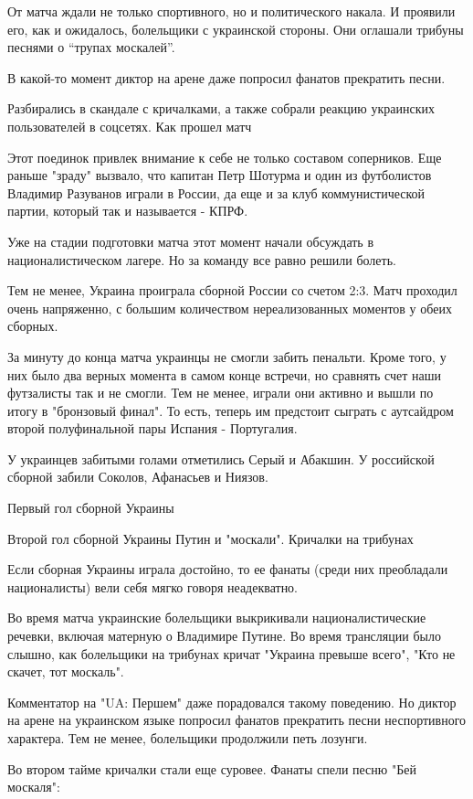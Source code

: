 От матча ждали не только спортивного, но и политического накала. И проявили
его, как и ожидалось, болельщики с украинской стороны. Они оглашали трибуны
песнями о \enquote{трупах москалей}. 

В какой-то момент диктор на арене даже попросил фанатов прекратить песни.

Разбирались в скандале с кричалками, а также собрали реакцию украинских пользователей в соцсетях.
Как прошел матч

Этот поединок привлек внимание к себе не только составом соперников. Еще раньше "зраду" вызвало, что капитан Петр Шотурма и один из футболистов Владимир Разуванов играли в России, да еще и за клуб коммунистической партии, который так и называется - КПРФ.

Уже на стадии подготовки матча этот момент начали обсуждать в националистическом лагере. Но за команду все равно решили болеть. 

Тем не менее, Украина проиграла сборной России со счетом 2:3. Матч проходил очень напряженно, с большим количеством нереализованных моментов у обеих сборных.

За минуту до конца матча украинцы не смогли забить пенальти. Кроме того, у них было два верных момента в самом конце встречи, но сравнять счет наши футзалисты так и не смогли. Тем не менее, играли они активно и вышли по итогу в "бронзовый финал". То есть, теперь им предстоит сыграть с аутсайдром второй полуфинальной пары Испания - Португалия.

У украинцев забитыми голами отметились Серый и Абакшин. У российской сборной забили Соколов, Афанасьев и Ниязов.

Первый гол сборной Украины

Второй гол сборной Украины
Путин и "москали". Кричалки на трибунах

Если сборная Украины играла достойно, то ее фанаты (среди них преобладали националисты) вели себя мягко говоря неадекватно.

Во время матча украинские болельщики выкрикивали националистические речевки, включая матерную о Владимире Путине. Во время трансляции было слышно, как болельщики на трибунах кричат "Украина превыше всего", "Кто не скачет, тот москаль".

Комментатор на "UA: Першем" даже порадовался такому поведению. Но диктор на арене на украинском языке попросил фанатов прекратить песни неспортивного характера. Тем не менее, болельщики продолжили петь лозунги.

Во втором тайме кричалки стали еще суровее. Фанаты спели песню "Бей москаля":

